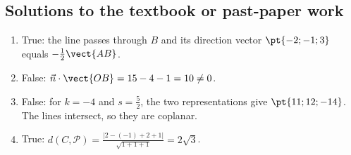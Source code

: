 \subsection{Solutions to the textbook or past-paper work}\begin{enumerate}
\item True: the line passes through $B$ and its direction vector $\pt{-2;-1;3}$ equals $-\frac12\vect{AB}$.
\item False: $\vec n\cdot\vect{OB}=15-4-1=10\ne0$.
\item False: for $k=-4$ and $s=\frac52$, the two representations give $\pt{11;12;-14}$. The lines intersect, so they are coplanar.
\item True: $d(C,\mathcal P)=\frac{|2-(-1)+2+1|}{\sqrt{1+1+1}}=2\sqrt3$.
\end{enumerate}

\fi

